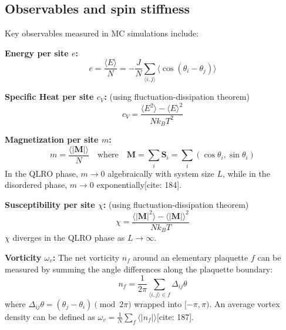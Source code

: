 \documentclass[11pt]{article}
\begin{document}
\subsection{Observables and spin stiffness}

Key observables measured in MC simulations include:

\textbf{Energy per site $e$:}
\begin{equation}
e = \frac{\langle E \rangle}{N} = -\frac{J}{N} \sum_{\langle i,j \rangle} \langle \cos(\theta_i - \theta_j) \rangle \label{eq:obs_e}
\end{equation}

\textbf{Specific Heat per site $c_V$:} (using fluctuation-dissipation theorem)
\begin{equation}
c_V = \frac{\langle E^2 \rangle - \langle E \rangle^2}{N k_B T^2} \label{eq:obs_cv}
\end{equation}

\textbf{Magnetization per site $m$:}
\begin{equation}
m = \frac{\langle |\mathbf{M}| \rangle}{N} \quad \text{where} \quad \mathbf{M} = \sum_i \mathbf{S}_i = \sum_i (\cos \theta_i, \sin \theta_i) \label{eq:obs_m}
\end{equation}
In the QLRO phase, $m \to 0$ algebraically with system size $L$, while in the disordered phase, $m \to 0$ exponentially[cite: 184].

\textbf{Susceptibility per site $\chi$:} (using fluctuation-dissipation theorem)
\begin{equation}
\chi = \frac{\langle |\mathbf{M}|^2 \rangle - \langle |\mathbf{M}| \rangle^2}{N k_B T} \label{eq:obs_chi}
\end{equation}
$\chi$ diverges in the QLRO phase as $L \to \infty$.

\textbf{Vorticity $\omega_v$:}
The net vorticity $n_f$ around an elementary plaquette $f$ can be measured by summing the angle differences along the plaquette boundary:
\begin{equation}
n_f = \frac{1}{2\pi} \sum_{\langle i,j \rangle \in f} \Delta_{ij}\theta \label{eq:vort_plaq}
\end{equation}
where $\Delta_{ij}\theta = (\theta_j - \theta_i) \pmod{2\pi}$ wrapped into $[-\pi, \pi)$. An average vortex density can be defined as $\omega_v = \frac{1}{N} \sum_f \langle |n_f| \rangle$[cite: 187].
\end{document}

